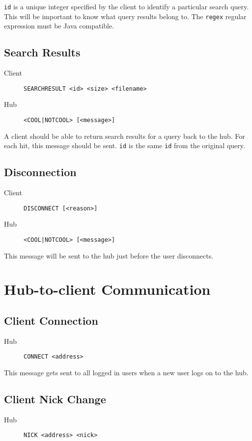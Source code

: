 \documentclass{article}
\begin{document}
\verb+id+ is a unique integer specified by the client to identify a particular search query.  This will be important to know what query results belong to.  The \verb+regex+ regular expression must be Java compatible.

\subsection{Search Results}
\begin{description}
\item[Client] \verb+SEARCHRESULT <id> <size> <filename>+
\item[Hub] \verb+<COOL|NOTCOOL> [<message>]+
\end{description}

A client should be able to return search results for a query back to the hub.  For each hit, this message should be sent.  \verb+id+ is the same \verb+id+ from the original query.

\subsection{Disconnection}
\begin{description}
\item[Client] \verb+DISCONNECT [<reason>]+
\item[Hub] \verb+<COOL|NOTCOOL> [<message>]+
\end{description}

This message will be sent to the hub just before the user disconnects.

\section{Hub-to-client Communication}

\subsection{Client Connection}
\begin{description}
\item[Hub] \verb+CONNECT <address>+
\end{description}

This message gets sent to all logged in users when a new user logs on to the hub.

\subsection{Client Nick Change}
\begin{description}
\item[Hub] \verb+NICK <address> <nick>+
\end{description}
\end{document}
